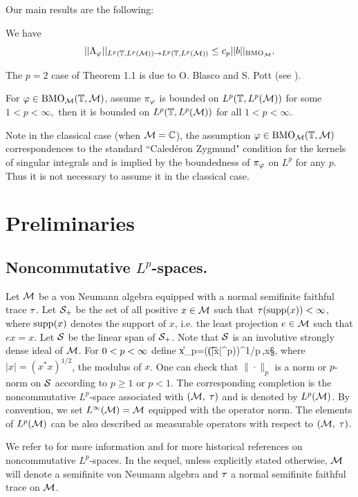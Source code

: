 Our main results are the following:

\begin{theorem}\label{lambda}
We have
\[
||\Lambda _\f||_{L^p(\T,{L^p(\M)})\rightarrow L^p(\T,{L^p(\M)})}\leq c_p||b||_{{\rm BMO}_{{\M}}}.
\]
\end{theorem}
The $p=2$ case of Theorem 1.1 is due to O. Blasco and S. Pott (see
\cite{BP}).

\begin{theorem}
For $\f\in {\rm BMO}_{{\M}}(\T,\M)$, assume $\pi _{\f}$
is bounded on $L^p(\T,{L^p(\M)})$ for some $1<p<\infty ,$ then it is bounded
on $L^p(\T,{L^p(\M)})$ for all $1<p<\infty .$
\end{theorem}

Note in the classical case (when $\M={\Bbb C}$), the assumption
$\f\in {\rm BMO}_{{\M}}(\T,\M)$ correspondences to the standard
``Caled\'eron Zygmund" condition for the kernels of singular
integrals and is implied by the boundedness of $\pi_\f$ on $L^p$ for
any $p$. Thus it is not necessary to assume it in the classical
case.


\section{Preliminaries}
\medskip\subsection{Noncommutative $L^p$-spaces.}

Let $\M$ be a von
Neumann algebra equipped with a normal semifinite faithful trace
$\t$. Let $\S_+$ be the set of all positive $x\in\M$ such that
$\t({\rm supp}(x))<\infty$,  where ${\rm supp}(x)$ denotes the
support of $x$, i.e.  the least projection $e\in \M$ such that
$ex=x$. Let $\S$ be the linear span of $\S_+$. Note that $\S$ is
an involutive strongly dense ideal of $\M$. For $0<p<\8$ define
 \be
 \|x\|_p=\big(\t(|x|^p)\big)^{1/p}\,,\quad x\in \S,
 \ee
where $|x|=(x^*x)^{1/2}$, the modulus of $x$.   One can check that
$\| \cdot \| _p$ is a norm or $p$-norm on $\S$ according to
$p\ge1$ or $p<1$.  The corresponding completion  is the
noncommutative $L^p$-space associated with $(\M,\;\t)$ and is
denoted by $L^p(\M)$.  By convention, we set $L^\infty(\M)=\M$
equipped with the operator norm.  The elements of $L^p(\M)$ can be
also described as measurable operators with respect to
$(\M,\;\t)$.

We refer to \cite{PX2} for more information and for more historical
references on noncommutative $L^p$-spaces. In the sequel, unless
explicitly stated otherwise, $\M$ will denote a semifinite von
Neumann algebra and $\t$ a normal semifinite faithful trace on $\M$.

